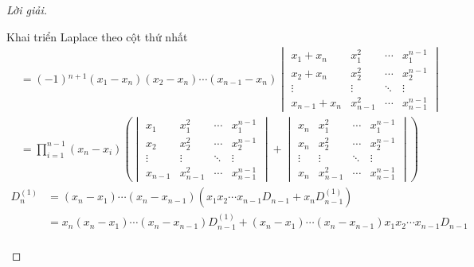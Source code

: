 \begin{proof}[Lời giải]
\begin{enumerate}[label = (\alph*)]
              Khai triển Laplace theo cột thứ nhất
              \begin{align*}
                   & = (-1){}^{n+1}(x_{1} - x_{n})(x_{2} - x_{n})\cdots (x_{n-1} - x_{n})
                  \begin{vmatrix}
                      x_{1} + x_{n}   & x_{1}^{2}   & \cdots & x_{1}^{n-1}   \\
                      x_{2} + x_{n}   & x_{2}^{2}   & \cdots & x_{2}^{n-1}   \\
                      \vdots          & \vdots      & \ddots & \vdots        \\
                      x_{n-1} + x_{n} & x_{n-1}^{2} & \cdots & x_{n-1}^{n-1}
                  \end{vmatrix}                  \\
                   & = \prod^{n-1}_{i=1}(x_{n} - x_{i})\left(
                  \begin{vmatrix}
                          x_{1}   & x_{1}^{2}   & \cdots & x_{1}^{n-1}   \\
                          x_{2}   & x_{2}^{2}   & \cdots & x_{2}^{n-1}   \\
                          \vdots  & \vdots      & \ddots & \vdots        \\
                          x_{n-1} & x_{n-1}^{2} & \cdots & x_{n-1}^{n-1}
                      \end{vmatrix}
                  +
                  \begin{vmatrix}
                          x_{n}  & x_{1}^{2}   & \cdots & x_{1}^{n-1}   \\
                          x_{n}  & x_{2}^{2}   & \cdots & x_{2}^{n-1}   \\
                          \vdots & \vdots      & \ddots & \vdots        \\
                          x_{n}  & x_{n-1}^{2} & \cdots & x_{n-1}^{n-1}
                      \end{vmatrix}
                  \right)
              \end{align*}
              \begingroup{}
              \allowdisplaybreaks{}
              \begin{align*}
                  D^{(1)}_{n} & = (x_{n} - x_{1})\cdots(x_{n} - x_{n-1})\left( x_{1}x_{2}\cdots x_{n-1} D_{n-1} + x_{n}D^{(1)}_{n-1}\right)                                                                                        \\
                              & = x_{n}(x_{n} - x_{1})\cdots(x_{n} - x_{n-1})D^{(1)}_{n-1} + (x_{n} - x_{1})\cdots (x_{n} - x_{n-1}) x_{1}x_{2}\cdots x_{n-1}D_{n-1}                                                               \\

\end{align*}
\end{enumerate}
\end{proof}
